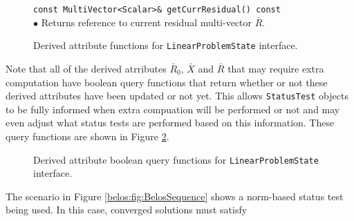 \documentclass[pdf,ps2pdf,11pt]{SANDreport}
\begin{document}
\begin{enumerate}
\begin{figure}
{\begin{minipage}{\textwidth}
{\scriptsize{}\noindent{}\texttt{const MultiVector<Scalar>\&
getCurrResidual() const}} \\ $\bullet$ Returns reference to current
residual multi-vector $\bar{R}$.

\end{minipage}
} %

\caption{\label{fig:LinearProblemState-functions}
Derived attribute functions for {}\texttt{Linear\-Problem\-State}
interface.  }

\end{figure}

Note that all of the derived atrributes $\bar{R}_0$, $\bar{X}$ and
$\bar{R}$ that may require extra computation have boolean query
functions that return whether or not these derived attributes have
been updated or not yet.  This allows {}\texttt{Status\-Test} objects
to be fully informed when extra compuation will be performed or not
and may even adjust what status tests are performed based on this
information.  These query functions are shown in Figure
{}\ref{fig:LinearProblemState-bool-functions}.

\begin{figure}


\caption{\label{fig:LinearProblemState-bool-functions}
Derived attribute boolean query functions for
{}\texttt{Linear\-Problem\-State} interface.  }

\end{figure}

The scenario in Figure {}\ref{belos:fig:BelosSequence} shows a
norm-based status test being used.  In this case, converged solutions
must satisfy


\end{enumerate}
\end{document}
